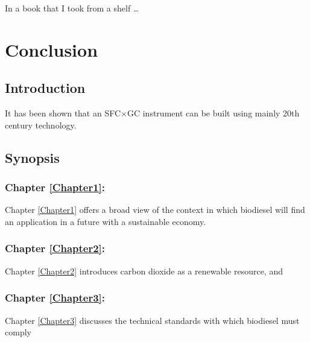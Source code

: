 
\begin{savequote}[45mm]
In a book that I took from a shelf \ldots
{}
\end{savequote}

\chapter{Conclusion} %

\label{Chapter8} %


\section{Introduction}

It has been shown that an SFC×GC instrument can be built using mainly 20th century technology. 

\section{Synopsis}

\subsection{Chapter \ref{Chapter1}:  }

Chapter \ref{Chapter1} offers a broad view of the context in which biodiesel
will find an application in a future with a sustainable economy.

\subsection{Chapter \ref{Chapter2}:  }

Chapter \ref{Chapter2} introduces carbon dioxide as a renewable resource, and 

\subsection{Chapter \ref{Chapter3}:  }

Chapter \ref{Chapter3} discusses the technical standards with which biodiesel must comply 


